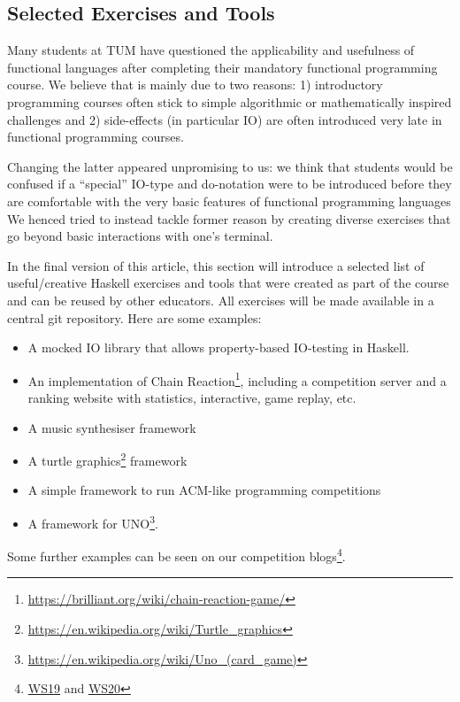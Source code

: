 \subsection{Selected Exercises and Tools}\label{sec:selected_exercises}

Many students at TUM have questioned the
applicability and usefulness
of functional languages after completing
their mandatory functional programming course.
We believe that is mainly due to two reasons:
1) introductory programming courses often stick
to simple algorithmic or mathematically inspired challenges and
2) side-effects (in particular IO)
are often introduced very late
in functional programming courses.

Changing the latter appeared unpromising to us:
we think that students would be confused
if a ``special'' IO-type and do-notation were to
be introduced before they are comfortable
with the very basic features of functional
programming languages
We henced tried to instead tackle former reason
by creating diverse exercises that go beyond
basic interactions with one's terminal.

In the final version of this article,
this section will introduce a selected list of
useful/creative Haskell exercises and tools
that were created as part of
the course and can be reused by other educators.
All exercises will be made available in a central git repository.
Here are some examples:
\begin{itemize}
\item A mocked IO library that allows property-based IO-testing in Haskell.
\item An implementation of Chain Reaction\footnote{\url{ https://brilliant.org/wiki/chain-reaction-game/}},
including a competition server
and a ranking website with statistics,
interactive, game replay, etc.
\item A music synthesiser framework
\item A turtle graphics\footnote{\url{https://en.wikipedia.org/wiki/Turtle_graphics}} framework
\item A simple framework to run ACM-like programming competitions
\item A framework for UNO\footnote{\url{https://en.wikipedia.org/wiki/Uno_(card_game)}}.
\end{itemize}
Some further examples can be seen on our competition blogs\footnote{\href{https://www21.in.tum.de/teaching/fpv/WS19/wettbewerb.html}{WS19} and \href{https://www21.in.tum.de/teaching/fpv/WS20/wettbewerb.html}{WS20}}.

